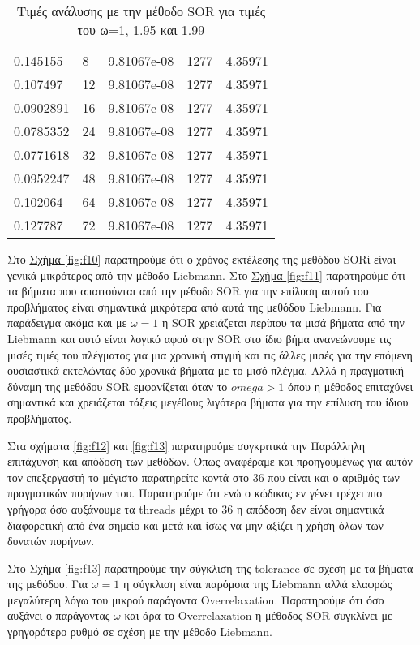 \documentclass[11pt]{scrartcl} %
\begin{document}
\begin{table}[h]
\begin{tabular}{lllll}
0.145155 & 8 & 9.81067e-08 & 1277 & 4.35971 \\
0.107497 & 12 & 9.81067e-08 & 1277 & 4.35971 \\
0.0902891 & 16 & 9.81067e-08 & 1277 & 4.35971 \\
0.0785352 & 24 & 9.81067e-08 & 1277 & 4.35971 \\
0.0771618 & 32 & 9.81067e-08 & 1277 & 4.35971 \\
0.0952247 & 48 & 9.81067e-08 & 1277 & 4.35971 \\
0.102064 & 64 & 9.81067e-08 & 1277 & 4.35971 \\
0.127787 & 72 & 9.81067e-08 & 1277 & 4.35971
\end{tabular}
\caption{Τιμές ανάλυσης με την μέθοδο SOR για τιμές του ω=1, 1.95 και 1.99}
\label{table:t3}
\end{table}

Στο \hyperref[fig:f10]{Σχήμα \ref*{fig:f10}} παρατηρούμε ότι ο χρόνος εκτέλεσης της μεθόδου SORί είναι γενικά μικρότερος από την μέθοδο Liebmann. Στο \hyperref[fig:f11]{Σχήμα \ref*{fig:f11}} παρατηρούμε ότι τα βήματα που απαιτούνται από την μέθοδο SOR για την επίλυση αυτού του προβλήματος είναι σημαντικά μικρότερα από αυτά της μεθόδου Liebmann. Για παράδειγμα ακόμα και με $\omega=1$ η SOR χρειάζεται περίπου τα μισά βήματα από την Liebmann και αυτό είναι λογικό αφού στην SOR στο ίδιο βήμα ανανεώνουμε τις μισές τιμές του πλέγματος για μια χρονική στιγμή και τις άλλες μισές για την επόμενη ουσιαστικά εκτελώντας δύο χρονικά βήματα με το μισό πλέγμα. Αλλά η πραγματική δύναμη της μεθόδου SOR εμφανίζεται όταν το $omega>1$ όπου η μέθοδος επιταχύνει σημαντικά και χρειάζεται τάξεις μεγέθους λιγότερα βήματα για την επίλυση του ίδιου προβλήματος. 


Στα σχήματα \hyperref[fig:f12]{\ref*{fig:f12}} και \hyperref[fig:f13]{\ref*{fig:f13}} παρατηρούμε συγκριτικά την Παράλληλη επιτάχυνση και απόδοση των μεθόδων. Όπως αναφέραμε και προηγουμένως για αυτόν τον επεξεργαστή το μέγιστο παρατηρείτε κοντά στο 36 που είναι και ο αριθμός των πραγματικών πυρήνων του. Παρατηρούμε ότι ενώ ο κώδικας εν γένει τρέχει πιο γρήγορα όσο αυξάνουμε τα threads μέχρι το 36 η απόδοση δεν είναι σημαντικά διαφορετική από ένα σημείο και μετά και ίσως να μην αξίζει η χρήση όλων των δυνατών πυρήνων.

Στο \hyperref[fig:f13]{Σχήμα \ref*{fig:f13}} παρατηρούμε την σύγκλιση της tolerance σε σχέση με τα βήματα της μεθόδου. Για $\omega=1$ η σύγκλιση είναι παρόμοια της Liebmann αλλά ελαφρώς μεγαλύτερη λόγω του μικρού παράγοντα Overrelaxation. Παρατηρούμε ότι όσο αυξάνει ο παράγοντας $\omega$ και άρα το Overrelaxation η μέθοδος SOR συγκλίνει με γρηγορότερο ρυθμό σε σχέση με την μέθοδο Liebmann.
\end{document}
